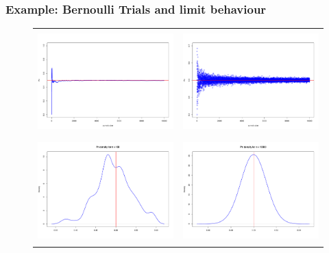 \documentclass[notes=show,smaller,handout]{beamer}\usepackage[]{graphicx}\usepackage[]{color}
\begin{document}
\begin{frame}%

\frametitle{Example: Bernoulli Trials and limit behaviour}

\begin{figure}[ptb]\centering
\begin{tabular} {cc}
\includegraphics[height=1.56in, width=2.2in]{img/OneSample_Pn.pdf} &
\includegraphics[height=1.56in, width=2.2in]{img/ManySamples_Pn.pdf} \\
\includegraphics[height=1.56in, width=2.2in]{img/NonGauss_Pn.pdf} &
\includegraphics[height=1.56in, width=2.2in]{img/Gauss_Pn.pdf}
\end{tabular}
\end{figure}%


\end{frame}%
\end{document}

